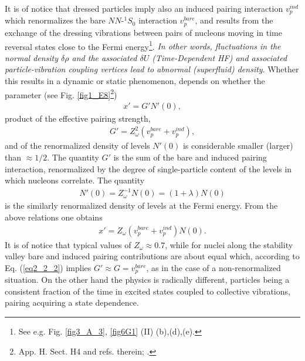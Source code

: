 It is of notice that dressed particles  imply also an induced pairing interaction $v_p^{ind}$ which renormalizes the bare $NN$-$^1S_0$ interaction $v_p^{bare}$, and results  from the exchange of the dressing vibrations between pairs of nucleons moving in time reversal states close to the Fermi energy\footnote{See e.g. Fig. \ref{fig3_A_3},  \ref{fig6G1} (II) (b),(d),(e).}. \textit{In other words, fluctuations in the normal density $\delta \rho$ and the associated $\delta U$ (Time-Dependent HF) and associated particle-vibration coupling vertices lead to abnormal (superfluid) density}. Whether this results in  a dynamic or static phenomenon, depends on whether the parameter (see Fig. \ref{fig1_E8}\footnote{\cite{Brink:05} App. H. Sect. H4 and refs. therein; \cite{Barranco:05}.}) 
\begin{align}\label{eq2_1_10}
x'=G'N'(0),  
\end{align}
product of the effective pairing strength, 
\begin{align}\label{eq2_2_2}
G'=Z_\omega^2(v_p^{bare}+v_p^{ind}),
\end{align}
and of the renormalized density of levels $N'(0)$ is considerable smaller  (larger) than $\approx1/2$. The quantity $G'$ is the sum of the bare and induced pairing interaction, renormalized by the degree of single-particle content of the levels in which nucleons correlate. The quantity 
\begin{align}
N'(0)=Z_\omega^{-1}N(0)=(1+\lambda)N(0)
\end{align}
is the similarly renormalized density of levels at the Fermi energy. From the above relations one obtains 
\begin{align}
x'=Z_\omega(v_p^{bare}+v_p^{ind})N(0).
\end{align}
It is of notice that typical values of $Z_\omega\approx0.7$, while for nuclei along the stability valley bare and induced pairing contributions are about equal which, according to Eq. (\ref{eq2_2_2}) implies $G'\approx G=v^{bare}_p$, as in the case of a non-renormalized situation. On the other hand the physics is radically different, particles being a consistent fraction of the time in excited states coupled to collective vibrations, pairing acquiring a state dependence. 
 

